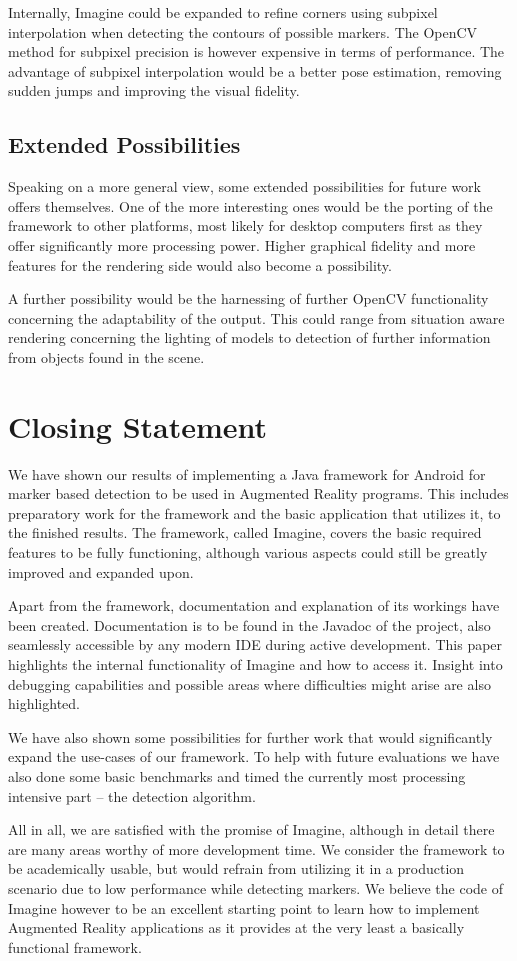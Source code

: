 Internally, Imagine could be expanded to refine corners using subpixel interpolation when detecting the contours of possible markers.
The OpenCV method for subpixel precision is however expensive in terms of performance.
The advantage of subpixel interpolation would be a better pose estimation, removing sudden jumps and improving the visual fidelity.

\subsection{Extended Possibilities}

Speaking on a more general view, some extended possibilities for future work offers themselves.
One of the more interesting ones would be the porting of the framework to other platforms, most likely for desktop computers first as they offer significantly more processing power.
Higher graphical fidelity and more features for the rendering side would also become a possibility.

A further possibility would be the harnessing of further OpenCV functionality concerning the adaptability of the output.
This could range from situation aware rendering concerning the lighting of models to detection of further information from objects found in the scene.

\newpage
\section{Closing Statement}

We have shown our results of implementing a Java framework for Android for marker based detection to be used in Augmented Reality programs.
This includes preparatory work for the framework and the basic application that utilizes it, to the finished results.
The framework, called Imagine, covers the basic required features to be fully functioning, although various aspects could still be greatly improved and expanded upon.

Apart from the framework, documentation and explanation of its workings have been created.
Documentation is to be found in the Javadoc of the project, also seamlessly accessible by any modern IDE during active development.
This paper highlights the internal functionality of Imagine and how to access it.
Insight into debugging capabilities and possible areas where difficulties might arise are also highlighted.

We have also shown some possibilities for further work that would significantly expand the use-cases of our framework.
To help with future evaluations we have also done some basic benchmarks and timed the currently most processing intensive part – the detection algorithm.

All in all, we are satisfied with the promise of Imagine, although in detail there are many areas worthy of more development time.
We consider the framework to be academically usable, but would refrain from utilizing it in a production scenario due to low performance while detecting markers.
We believe the code of Imagine however to be an excellent starting point to learn how to implement Augmented Reality applications as it provides at the very least a basically functional framework.
